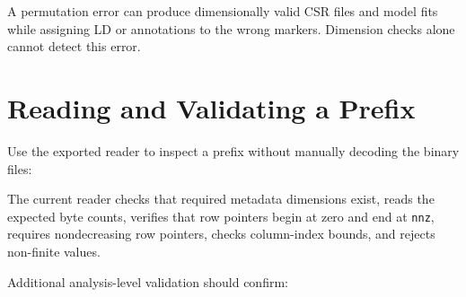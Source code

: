 \documentclass[
  11pt,
  letterpaper,
  DIV=11,
  numbers=noendperiod]{scrartcl}
\newenvironment{Shaded}{\begin{snugshade}}{\end{snugshade}}
\newcommand{\AttributeTok}[1]{\textcolor[rgb]{0.00,0.34,0.68}{#1}}
\newcommand{\ConstantTok}[1]{\textcolor[rgb]{0.67,0.33,0.00}{#1}}
\newcommand{\DecValTok}[1]{\textcolor[rgb]{0.69,0.50,0.00}{#1}}
\newcommand{\FunctionTok}[1]{\textcolor[rgb]{0.39,0.29,0.61}{#1}}
\newcommand{\NormalTok}[1]{\textcolor[rgb]{0.12,0.11,0.11}{#1}}
\newcommand{\OtherTok}[1]{\textcolor[rgb]{0.00,0.43,0.16}{#1}}
\newcommand{\SpecialCharTok}[1]{\textcolor[rgb]{0.24,0.68,0.91}{#1}}
\newcommand{\StringTok}[1]{\textcolor[rgb]{0.75,0.01,0.01}{#1}}
\begin{document}
A permutation error can produce dimensionally valid CSR files and model
fits while assigning LD or annotations to the wrong markers. Dimension
checks alone cannot detect this error.

\section{Reading and Validating a
Prefix}\label{reading-and-validating-a-prefix}

Use the exported reader to inspect a prefix without manually decoding
the binary files:

\begin{Shaded}
\end{Shaded}

The current reader checks that required metadata dimensions exist, reads
the expected byte counts, verifies that row pointers begin at zero and
end at \texttt{nnz}, requires nondecreasing row pointers, checks
column-index bounds, and rejects non-finite values.

Additional analysis-level validation should confirm:
\end{document}
